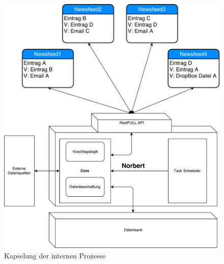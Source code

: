 \begin{figure}[H]
\centering
\includegraphics[scale=0.6]{uml-diagramms/overview_detail.pdf}
\caption{Kapselung der internen Prozesse}
\label{fig: Overview_Detail}
\end{figure}




        